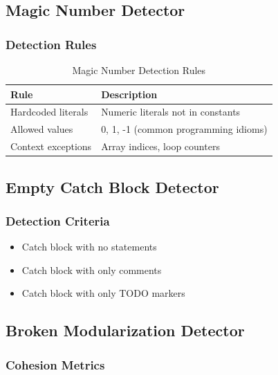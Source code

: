 \documentclass[12pt,a4paper]{article}
\begin{document}
    \subsection{Magic Number Detector}

    \subsubsection{Detection Rules}

    \begin{table}[H]
        \caption{Magic Number Detection Rules}
        \begin{tabular}{|l|l|}
            \hline
            \textbf{Rule} & \textbf{Description} \\
            \hline
            Hardcoded literals & Numeric literals not in constants \\
            \hline
            Allowed values & 0, 1, -1 (common programming idioms) \\
            \hline
            Context exceptions & Array indices, loop counters \\
            \hline
        \end{tabular}
    \end{table}

    \subsection{Empty Catch Block Detector}

    \subsubsection{Detection Criteria}

    \begin{itemize}[leftmargin=0.5in]
        \item Catch block with no statements
        \item Catch block with only comments
        \item Catch block with only TODO markers
    \end{itemize}

    \subsection{Broken Modularization Detector}

    \subsubsection{Cohesion Metrics}
\end{document}
